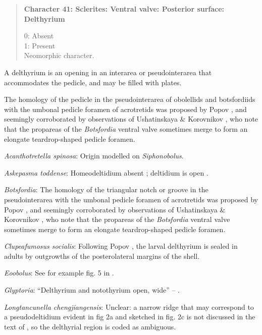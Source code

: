 \documentclass[openany]{book}
\theoremstyle{definition}
\theoremstyle{definition}
\theoremstyle{definition}
\theoremstyle{remark}
\begin{document}
\begin{quote}
\textbf{Character 41: Sclerites: Ventral valve: Posterior surface:
Delthyrium}

0: Absent\\
1: Present\\
Neomorphic character.
\end{quote}

A delthyrium is an opening in an interarea or pseudointerarea that
accommodates the pedicle, and may be filled with plates.

The homology of the pedicle in the pseudointerarea of obolellids and
botsfordiids with the umbonal pedicle foramen of acrotretids was
proposed by Popov \citeyearpar{Popov1992TheCambrian}, and seemingly
corroborated by observations of Ushatinskaya \& Korovnikov
\citeyearpar{Ushatinskaya2016Revisionof}, who note that the propareas of
the \emph{Botsfordia} ventral valve sometimes merge to form an elongate
teardrop-shaped pedicle foramen.

\hypertarget{Acanthotretella_spinosa-coding-41}{}
\emph{Acanthotretella spinosa}: Origin modelled on \emph{Siphonobolus}.

\hypertarget{Askepasma_toddense-coding-41}{}
\emph{Askepasma toddense}: Homeodeltidium absent
\citep[p.~153]{Williams2000LinguliformeaCraniiformea}; deltidium is open
\citep[see][fig. 4]{Topper2013Theoldest}.

\hypertarget{Botsfordia-coding-41}{}
\emph{Botsfordia}: The homology of the triangular notch or groove in the
pseudointerarea with the umbonal pedicle foramen of acrotretids was
proposed by Popov \citeyearpar{Popov1992TheCambrian}, and seemingly
corroborated by observations of Ushatinskaya \& Korovnikov
\citeyearpar{Ushatinskaya2016Revisionof}, who note that the propareas of
the \emph{Botsfordia} ventral valve sometimes merge to form an elongate
teardrop-shaped pedicle foramen.

\hypertarget{Clupeafumosus_socialis-coding-41}{}
\emph{Clupeafumosus socialis}: Following Popov
\citeyearpar{Popov1992TheCambrian}, the larval delthyrium is sealed in
adults by outgrowths of the posterolateral margins of the shell.

\hypertarget{Eoobolus-coding-41}{}
\emph{Eoobolus}: See for example fig. 5 in
\citet{Balthasar2009Thebrachiopod}.

\hypertarget{Glyptoria-coding-41}{}
\emph{Glyptoria}: ``Delthyrium and notothyrium open, wide'' --
\citet{Cooper1976LowerCambrian}.

\hypertarget{Longtancunella_chengjiangensis-coding-41}{}
\emph{Longtancunella chengjiangensis}: Unclear: a narrow ridge that may
correspond to a pseudodeltidium evident in fig 2a and sketched in fig.
2c is not discussed in the text of \citet{Zhang2011Theexceptionally}, so
the delthyrial region is coded as ambiguous.
\end{document}
